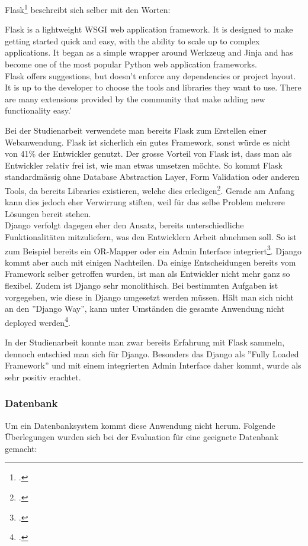 Flask\footcite{flask:foreword} beschreibt sich selber mit den Worten:

\begin{displayquote}
Flask is a lightweight WSGI web application framework. It is designed to make getting started quick and easy, with the ability to scale up to complex applications. It began as a simple wrapper around Werkzeug and Jinja and has become one of the most popular Python web application frameworks. \\
Flask offers suggestions, but doesn't enforce any dependencies or project layout. It is up to the developer to choose the tools and libraries they want to use. There are many extensions provided by the community that make adding new functionality easy.'
\end{displayquote}

Bei der Studienarbeit verwendete man bereits Flask zum Erstellen einer Webanwendung. Flask ist sicherlich ein gutes Framework, sonst würde es nicht von 41\% der Entwickler genutzt. Der grosse Vorteil von Flask ist, dass man als Entwickler relativ frei ist, wie man etwas umsetzen möchte. So kommt Flask standardmässig ohne Database Abstraction Layer, Form Validation oder anderen Tools, da bereits Libraries existieren, welche dies erledigen\footcite{flask:design}. Gerade am Anfang kann dies jedoch eher Verwirrung stiften, weil für das selbe Problem mehrere Lösungen bereit stehen. \\

Django verfolgt dagegen eher den Ansatz, bereits unterschiedliche Funktionalitäten mitzuliefern, was den Entwicklern Arbeit abnehmen soll. So ist zum Beispiel bereits ein OR-Mapper oder ein Admin Interface integriert\footcite{django:overview}. 
Django kommt aber auch mit einigen Nachteilen. Da einige Entscheidungen bereits vom Framework selber getroffen wurden, ist man als Entwickler nicht mehr ganz so flexibel. Zudem ist Django sehr monolithisch. Bei bestimmten Aufgaben ist vorgegeben, wie diese in Django umgesetzt werden müssen. Hält man sich nicht an den ''Django Way'', kann unter Umständen die gesamte Anwendung nicht deployed werden\footcite{django:advantages_disadvantages}.

In der Studienarbeit konnte man zwar bereits Erfahrung mit Flask sammeln, dennoch entschied man sich für Django. Besonders das Django als ''Fully Loaded Framework'' und mit einem integrierten Admin Interface daher kommt, wurde als sehr positiv erachtet.


\subsubsection*{Datenbank}
Um ein Datenbanksystem kommt diese Anwendung nicht herum. Folgende Überlegungen wurden sich bei der Evaluation für eine geeignete Datenbank gemacht:

